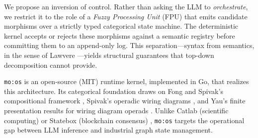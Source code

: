 \documentclass[submission,copyright,creativecommons]{eptcs}
\begin{document}
We propose an inversion of control. Rather than asking the LLM to
\emph{orchestrate}, we restrict it to the role of a \emph{Fuzzy Processing
Unit} (FPU) that emits candidate morphisms over a strictly typed categorical
state machine. The deterministic kernel accepts or rejects these morphisms
against a semantic registry before committing them to an append-only log. This
separation---syntax from semantics, in the sense of Lawvere
\cite{lawvere1963}---yields structural guarantees that top-down decomposition
cannot provide.

\texttt{mo:os} is an open-source (MIT) runtime kernel, implemented in Go,
that realizes this architecture. Its categorical foundation draws on Fong and
Spivak's compositional framework \cite{fong2018}, Spivak's operadic wiring
diagrams \cite{spivak2013,spivak2013operad}, and Yau's finite presentation
results for wiring diagram operads \cite{yau2018}. Unlike Catlab (scientific
computing) or Statebox (blockchain consensus) \cite{statebox2019}, \texttt{mo:os}
targets the operational gap between LLM inference and industrial graph
state management.
\end{document}
